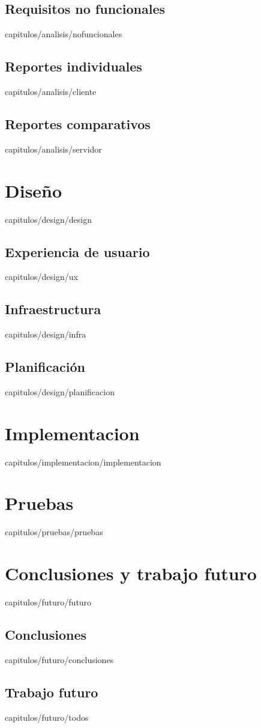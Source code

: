 \documentclass[epsbased,copyright,final,printable,covers,extendedindex,firstnumbered,tfg,gnuplot]{thesis}
\begin{document}
  \section{Requisitos no funcionales\label{SEC:NOFUNCIONALES}}{capitulos/analisis/nofuncionales}
  \section{Reportes individuales\label{SEC:CLIENTE}}{capitulos/analisis/cliente}
  \section{Reportes comparativos\label{SEC:SERVIDOR}}{capitulos/analisis/servidor}

\chapter{Diseño\label{CAP:DESIGN}}{capitulos/design/design}
  \section{Experiencia de usuario\label{SEC:UX}}{capitulos/design/ux}
  \section{Infraestructura\label{SEC:INFRA}}{capitulos/design/infra}
  \section{Planificación\label{SEC:PLANIFICACION}}{capitulos/design/planificacion}

\chapter{Implementacion\label{CAP:IMPLEMENTACION}}{capitulos/implementacion/implementacion}

\chapter{Pruebas\label{CAP:PRUEBAS}}{capitulos/pruebas/pruebas}

\chapter{Conclusiones y trabajo futuro\label{CAP:FUTURO}}{capitulos/futuro/futuro}
  \section{Conclusiones\label{SEC:CONCLUSIONES}}{capitulos/futuro/conclusiones}
  \section{Trabajo futuro\label{SEC:TODOS}}{capitulos/futuro/todos}
\end{document}
